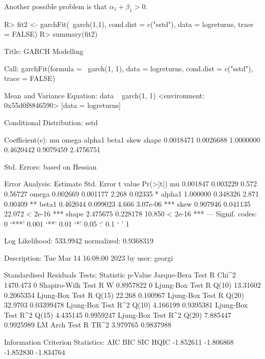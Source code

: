\documentclass[article,nojss]{jss}
\begin{document}
Another possible problem is that $\alpha_{1} + \beta_{1} > 0$.


\begin{Schunk}
\begin{Sinput}
R> fit2 <- garchFit(~garch(1,1), cond.dist = c("sstd"), data = logreturns, trace = FALSE)
R> summary(fit2)
\end{Sinput}
\begin{Soutput}
Title:
 GARCH Modelling 

Call:
 garchFit(formula = ~garch(1, 1), data = logreturns, cond.dist = c("sstd"), 
    trace = FALSE) 

Mean and Variance Equation:
 data ~ garch(1, 1)
<environment: 0x55d0f8846590>
 [data = logreturns]

Conditional Distribution:
 sstd 

Coefficient(s):
       mu      omega     alpha1      beta1       skew      shape  
0.0018471  0.0026688  1.0000000  0.4620442  0.9079459  2.4756751  

Std. Errors:
 based on Hessian 

Error Analysis:
        Estimate  Std. Error  t value Pr(>|t|)    
mu      0.001847    0.003229    0.572  0.56727    
omega   0.002669    0.001177    2.268  0.02335 *  
alpha1  1.000000    0.348326    2.871  0.00409 ** 
beta1   0.462044    0.099023    4.666 3.07e-06 ***
skew    0.907946    0.041135   22.072  < 2e-16 ***
shape   2.475675    0.228178   10.850  < 2e-16 ***
---
Signif. codes:  0 ‘***’ 0.001 ‘**’ 0.01 ‘*’ 0.05 ‘.’ 0.1 ‘ ’ 1

Log Likelihood:
 533.9942    normalized:  0.9368319 

Description:
 Tue Mar 14 16:08:00 2023 by user: georgi 


Standardised Residuals Tests:
                                Statistic p-Value   
 Jarque-Bera Test   R    Chi^2  1470.473  0         
 Shapiro-Wilk Test  R    W      0.8957822 0         
 Ljung-Box Test     R    Q(10)  13.31602  0.2065354 
 Ljung-Box Test     R    Q(15)  22.268    0.100967  
 Ljung-Box Test     R    Q(20)  32.9703   0.03399478
 Ljung-Box Test     R^2  Q(10)  4.166199  0.9395381 
 Ljung-Box Test     R^2  Q(15)  4.435145  0.9959247 
 Ljung-Box Test     R^2  Q(20)  7.885447  0.9925989 
 LM Arch Test       R    TR^2   3.979765  0.9837988 

Information Criterion Statistics:
      AIC       BIC       SIC      HQIC 
-1.852611 -1.806868 -1.852830 -1.834764 
\end{Soutput}
\end{Schunk}
\end{document}

